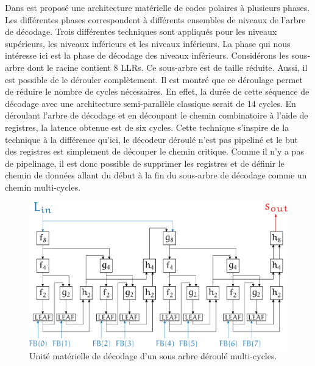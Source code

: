 Dans \cite{gal_scalable_2016} est proposé une architecture matérielle de codes polaires à plusieurs phases. Les différentes phases correspondent à différents ensembles de niveaux de l'arbre de décodage. Trois différentes techniques sont appliqués pour les niveaux supérieurs, les niveaux inférieurs et les niveaux inférieurs. La phase qui nous intéresse ici est la phase de décodage des niveaux inférieurs. Considérons les sous-arbre dont le \noeud racine contient 8 LLRs. Ce sous-arbre est de taille réduite. Aussi, il est possible de le dérouler complètement. Il est montré que ce déroulage permet de réduire le nombre de cycles nécessaires. En effet, la durée de cette séquence de décodage avec une architecture semi-parallèle classique serait de 14 cycles. En déroulant l'arbre de décodage et en découpant le chemin combinatoire à l'aide de registres, la latence obtenue est de six cycles. Cette technique s'inspire de la technique \cite{giard_unrolled_2015} à la différence qu'ici, le décodeur déroulé n'est pas pipeliné et le but des registres est simplement de découper le chemin critique. Comme il n'y a pas de pipelinage, il est donc possible de supprimer les registres et de définir le chemin de données allant du début à la fin du sous-arbre de décodage comme un chemin multi-cycles.

\begin{figure}[htp]
	\centering
	\includegraphics[width=\textwidth]{main/ch4_fig/unrolled_multicycle}
	\caption{Unité matérielle de décodage d'un sous arbre déroulé multi-cycles.}
	\label{fig:unrolled_multicycle}
\end{figure}

